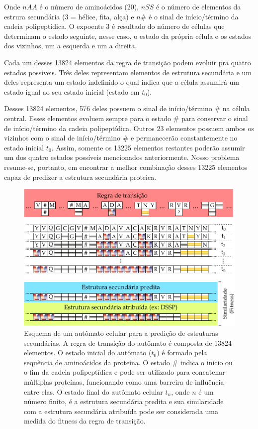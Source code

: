 \documentclass[]{scrreprt}
\begin{document}
Onde $nAA$ é o número de aminoácidos (20), $nSS$ é o número de elementos da estrura secundária (3 = hélice, fita, alça) e $n\#$ é o sinal de início/término da cadeia polipeptídica. O expoente 3 é resultado do número de células que determinam o estado seguinte, nesse caso, o estado da própria célula e os estados dos vizinhos, um a esquerda e um a direita. 

Cada um desses 13824 elementos da regra de transição podem evoluir pra quatro estados possíveis. Três deles representam elementos de estrutura secundária e um deles representa um estado indefinido o qual indica que a célula assumirá um estado igual ao seu estado inicial (estado em $t_{0}$).

Desses 13824 elementos, 576 deles possuem o sinal de início/término $\#$ na célula central. Esses elementos evoluem sempre para o estado $\#$ para conservar o sinal de início/término da cadeia polipeptídica. Outros 23 elementos possuem ambos os vizinhos com o sinal de início/término $\#$ e permanecerão constantemente no estado inicial $t_{0}$. Assim, somente os 13225 elementos restantes poderão assumir um dos quatro estados possíveis mencionados anteriormente. Nosso problema resume-se, portanto, em encontrar a melhor combinação desses 13225 elementos capaz de predizer a estrutura secundária proteica. 

\begin{figure}
	\label{ca_ss}
	\includegraphics{ca-ss_final}
	\caption{Esquema de um autômato celular para a predição de estruturas secundárias. A regra de transição do autômato é composta de 13824 elementos. O estado inicial do autômato ($t_{0}$) é formado pela sequência de aminoácidos da proteína. O estado $\#$ indica o início ou o fim da cadeia polipeptídica e pode ser utilizado para concatenar múltiplas proteínas, funcionando como uma barreira de influência entre elas. O estado final do autômato celular $t_{n}$, onde $n$ é um número finito, é a estrutura secundária predita e sua similaridade com a estrutura secundária atribuída pode ser considerada uma medida do fitness da regra de transição.}
\end{figure}
\end{document}
